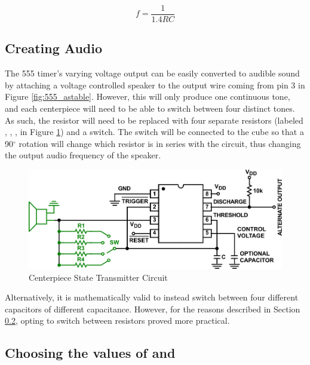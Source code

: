\begin{equation}\label{eq:555-freq}
    f = \frac{1}{1.4 R C}
\end{equation}

\subsection{Creating Audio}

The 555 timer's varying voltage output can be easily converted to
audible sound by attaching a voltage controlled speaker to the output
wire coming from pin 3 in Figure \ref{fig:555_astable}. However, this
will only produce one continuous tone, and each centerpiece will need
to be able to switch between four distinct tones. As such, the resistor
 will need to be replaced with four separate resistors (labeled
, , ,  in Figure
\ref{fig:555_astable_modded}) and a switch. The switch will be
connected to the cube so that a 90$^\circ$ rotation will change which
resistor is in series with the circuit, thus changing the output audio
frequency of the speaker.

\begin{figure}[h]
    \centering
    \caption{Centerpiece State Transmitter Circuit}
    \label{fig:555_astable_modded}
    \includegraphics[width=\linewidth]{Figures/6 PCB Design/555_astable_modded.png}
\end{figure}

Alternatively, it is mathematically valid to instead switch between
four different capacitors of different capacitance. However, for the
reasons described in Section \ref{subsec:freq-selection}, opting to
switch between resistors proved more practical.

\subsection{Choosing the values of  and }
\label{subsec:freq-selection}

